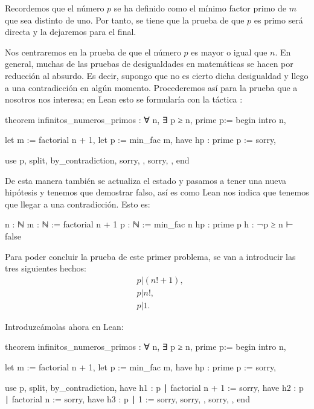 Recordemos que el número \(p\) se ha definido como el mínimo factor primo de
\(m\) que sea distinto de uno. Por tanto, se tiene que la prueba de que \(p\)
es primo será directa y la dejaremos para el final.

Nos centraremos en la prueba de que el número \(p\) es mayor o igual que
\(n\).  En general, muchas de las pruebas de desigualdades en
matemáticas se hacen por reducción al absurdo. Es decir, supongo que no
es cierto dicha desigualdad y llego a una contradicción en algún
momento. Procederemos así para la prueba que a nosotros nos interesa; en
Lean esto se formularía con la táctica
:
\begin{leancode}
theorem infinitos_numeros_primos : ∀ n, ∃ p ≥ n, prime p:=
begin
  intro n,

  let m := factorial n + 1,
  let p := min_fac m,
  have hp : prime p := sorry,

  use p,
  split,
  { by_contradiction,
    sorry, },
  { sorry, },
end
\end{leancode}

De esta manera también se actualiza el estado y pasamos a tener una
nueva hipótesis y tenemos que demostrar falso, así es como Lean nos
indica que tenemos que llegar a una contradicción. Esto es:
\begin{leancode}
n : ℕ
m : ℕ := factorial n + 1
p : ℕ := min_fac n
hp : prime p
h : ¬p ≥ n
⊢ false
\end{leancode}

Para poder concluir la prueba de este primer problema, se van a introducir
las tres siguientes hechos:
\begin{align}
  &p | (n!+1),\tag{h1}\label{h1intro}\\
  &p | n!,    \tag{h2}\label{h2intro}\\
  &p | 1.     \tag{h3}\label{h3intro}
\end{align}

Introduzcámolas ahora en Lean:
\begin{leancode}
theorem infinitos_numeros_primos : ∀ n, ∃ p ≥ n, prime p:=
begin
  intro n,

  let m := factorial n + 1,
  let p := min_fac m,
  have hp : prime p := sorry,

  use p,
  split,
  { by_contradiction,
    have h1 : p ∣ factorial n + 1 := sorry,
    have h2 : p ∣ factorial n := sorry,
    have h3 : p ∣ 1 := sorry,
    sorry, },
  { sorry, },
end
\end{leancode}

